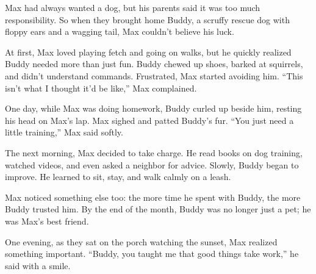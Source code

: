 \documentclass[12pt]{article}
\begin{document}
\begin{tcolorbox}[colframe=black!60, colback=white, 
coltitle=black, colbacktitle=black!15, fonttitle=\bfseries\Large, 
title=Max's Buddy, halign title=center, left=10pt, right=10pt, top=10pt, bottom=15pt]

Max had always wanted a dog, but his parents said it was too much responsibility. So when they brought home Buddy, a scruffy rescue dog with floppy ears and a wagging tail, Max couldn’t believe his luck.

At first, Max loved playing fetch and going on walks, but he quickly realized Buddy needed more than just fun. Buddy chewed up shoes, barked at squirrels, and didn’t understand commands. Frustrated, Max started avoiding him. “This isn’t what I thought it’d be like,” Max complained.

One day, while Max was doing homework, Buddy curled up beside him, resting his head on Max’s lap. Max sighed and patted Buddy’s fur. “You just need a little training,” Max said softly.

The next morning, Max decided to take charge. He read books on dog training, watched videos, and even asked a neighbor for advice. Slowly, Buddy began to improve. He learned to sit, stay, and walk calmly on a leash.

Max noticed something else too: the more time he spent with Buddy, the more Buddy trusted him. By the end of the month, Buddy was no longer just a pet; he was Max’s best friend.

One evening, as they sat on the porch watching the sunset, Max realized something important. “Buddy, you taught me that good things take work,” he said with a smile.

 

\end{tcolorbox}
\end{document}
